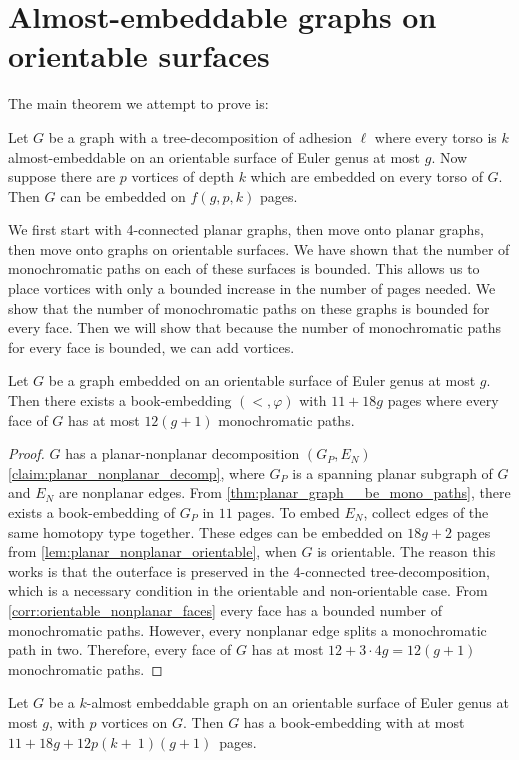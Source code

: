 \section{Almost-embeddable graphs on orientable surfaces}

The main theorem we attempt to prove is:
\begin{theorem}\label{thm:orientablevortices}
	Let $G$ be a graph with a tree-decomposition of adhesion $\ell$ where every torso is $k$ almost-embeddable on an orientable surface of Euler genus at most $g$. Now suppose there are $p$ vortices of depth $k$ which are embedded on every torso of $G$. Then $G$ can be embedded on $f(g, p, k)$ pages.
\end{theorem}


We first start with 4-connected planar graphs, then move onto planar graphs, then move onto graphs on orientable surfaces. We have shown that the number of monochromatic paths on each of these surfaces is bounded. This allows us to place vortices with only a bounded increase in the number of pages needed. We show that the number of monochromatic paths on these graphs is bounded for every face. Then we will show that because the number of monochromatic paths for every face is bounded, we can add vortices.

\begin{lemma}\label{lem:orientablesurfaces_monochromatic_edges}
	Let $G$ be a graph embedded on an orientable surface of Euler genus at most $g$. Then there exists a book-embedding $(<, \varphi)$ with $11 + 18g$ pages where every face of $G$ has at most $12(g + 1)$ monochromatic paths.
\end{lemma}
\begin{proof}
	$G$ has a planar-nonplanar decomposition $(G_P, E_N)$ \cref{claim:planar_nonplanar_decomp}, where $G_P$ is a spanning planar subgraph of $G$ and $E_N$ are nonplanar edges. From \cref{thm:planar_graph__be_mono_paths}, there exists a book-embedding of $G_P$ in $11$ pages. To embed $E_N$, collect edges of the same homotopy type together. These edges can be embedded on $18g+2$ pages from \cref{lem:planar_nonplanar_orientable}, when $G$ is orientable. The reason this works is that the outerface is preserved in the $4$-connected tree-decomposition, which is a necessary condition in the orientable and non-orientable case.
	From \cref{corr:orientable_nonplanar_faces} every face has a bounded number of monochromatic paths. However, every nonplanar edge splits a monochromatic path in two. Therefore, every face of $G$ has at most $12 + 3 \cdot 4g = 12(g + 1)$ monochromatic paths.
\end{proof}
\begin{lemma}\label{lem:orientablesurfaces_almostembeddable}
	Let $G$ be a $k$-almost embeddable graph on an orientable surface of Euler genus at most $g$, with $p$ vortices on $G$. Then $G$ has a book-embedding with at most $11+18g+12p(k +~1)(g + 1)$~pages.
\end{lemma}

